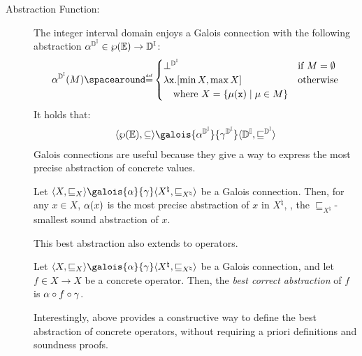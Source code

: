 \begin{description}
    \newpage
    \item[Abstraction Function:]
    The integer interval domain enjoys a Galois connection with the following abstraction $\alpha^{\mathbb{D}^{\mathbb{I}}}\in\wp(\mathbb{E})\to\mathbb{D}^{\mathbb{I}}$:
    \begin{align*}
      \intervalabstractdomainabstraction(\defsetofenvs) \DefeQ \begin{cases}
        \intervalabstractdomainbottom & \text{if } \defsetofenvs = \emptyset \\
        \lambda \defvariable.\interval{\min X}{\max X} & \text{otherwise} \\
        \quad \text{where } X = \setdef{\defenv(\defvariable)}{\defenv\in\defsetofenvs}
      \end{cases}
    \end{align*}
    It holds that:
  \begin{align*}
    \tuple{\setof{\env}}{\subseteq} \galois{\intervalabstractdomainabstraction}{\intervalabstractdomainconcretization}\tuple{\intervalabstractdomaintype}{\intervalabstractdomainsubseteq}
  \end{align*}
  Galois connections are useful because they give a way to express the most precise abstraction of concrete values.
  \begin{remark}
    Let $\tuple{X}{\sqsubseteq_X} \galois{\abstraction}{\concretization}\tuple{X^\natural}{\sqsubseteq_{X^\natural}}$ be a Galois connection. Then, for any $x \in X$, $\alpha(x)$ is the most precise abstraction of $x$ in $X^\natural$, \ie, the $\sqsubseteq_{X^\natural}$-smallest sound abstraction of $x$.
  \end{remark}
  This best abstraction also extends to operators.
  \begin{definition}
    Let $\tuple{X}{\sqsubseteq_X} \galois{\abstraction}{\concretization}\tuple{X^\natural}{\sqsubseteq_{X^\natural}}$ be a Galois connection, and let $f\in X\to X$ be a concrete operator. Then, the \emph{best correct abstraction} of $f$ is $\alpha \circ f \circ \gamma$.
  \end{definition}
  Interestingly,  above provides a constructive way to define the best abstraction of concrete operators, without requiring a priori definitions and soundness proofs.

\end{description}

